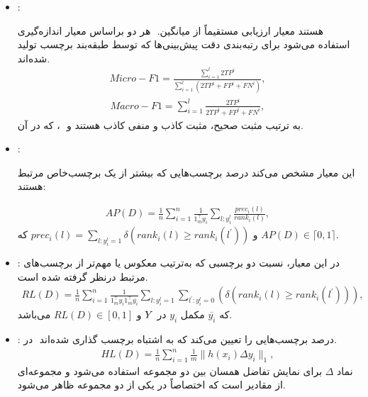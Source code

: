 \begin{itemize}
	
	\item	{} :
	
	هر دو براساس معیار اندازه‌گیری ‎ ‎.هستند معیار ارزیابی مستقیماً از میانگین‌‌‌ ‎ استفاده می‌شود برای رتبه‌بندی دقت پیش‌بینی‌ها که توسط طبقه‌بند برچسب تولید شده‌اند.
	\begin{align}
		{Micro-F1} = \frac{\sum_{i=1}^{l} 2 TP^i}{\sum_{i=1}^{l}(2 TP^i + FP^i + FN^i)},
	\end{align}
	\begin{align}
		{Macro-F1} = \sum_{i=1}^{l} \frac{2 TP^i}{2 TP^i + FP^i + FN^i},
	\end{align}
	که در آن ‎، ‎‎ و ‎‎به ترتیب مثبت صحیح، مثبت کاذب و منفی کاذب هستند.
	
	\item {}:
	
	
	این معیار مشخص می‌کند درصد برچسب‌هایی که بیشتر از یک برچسب‌خاص مرتبط هستند:
	
	\begin{align}
		{AP(D)} = \frac{1}{n} \sum_{i=1}^{n} \frac{1}{1^\top_m y_i} \sum_{l:y^l_i}^{}\frac{prec_i(l)}{rank_i(l)},
	\end{align}
	که‎
	$prec_i(l)=\sum_{l:y^l_i=1}^{} \delta(rank_i(l) \geq rank_i(l^\prime))$ و $AP(D) \in \lceil 0,1 \rceil $.
	
	\item	{}:
	در این معیار، نسبت دو برچسبی که به‌ترتیب معکوس یا مهم‌تر از برچسب‌های مرتبط درنظر گرفته شده است.
	\begin{align}
		{RL(D)} = \frac{1}{n} \sum_{i=1}^{n} \frac{1}{1^\top_m y_i 1^\top_m \overline{y_i}} \sum_{l:y^l_i=1}^{}\sum_{l^\prime:y^l_i=0}^{}(\delta(rank_i(l) \geq rank_i(l^\prime))),
	\end{align}
	که 
	$\overline{y_i}$ 
	مکمل
	$y_i$ در $\boldmath{Y}$ و $‎RL(D) \in [0, 1]$
	می‌باشد.
	\item	{}:
	در ‎ درصد برچسب‌هایی را تعیین می‌کند که به اشتباه برچسب‌ گذاری شده‌اند.
	\begin{align}
		{HL(D)} = \frac{1}{n} \sum_{i=1}^{n} \frac{1}{m} \lVert h(x_i) \Delta y_i \lVert_1,
	\end{align}
	نماد $\Delta$ برای نمایش تفاضل همسان بین دو مجموعه استفاده می‌شود و مجموعه‌ای از مقادیر است که اختصاصاً در یکی از دو مجموعه ظاهر می‌شود.
	

\end{itemize}
